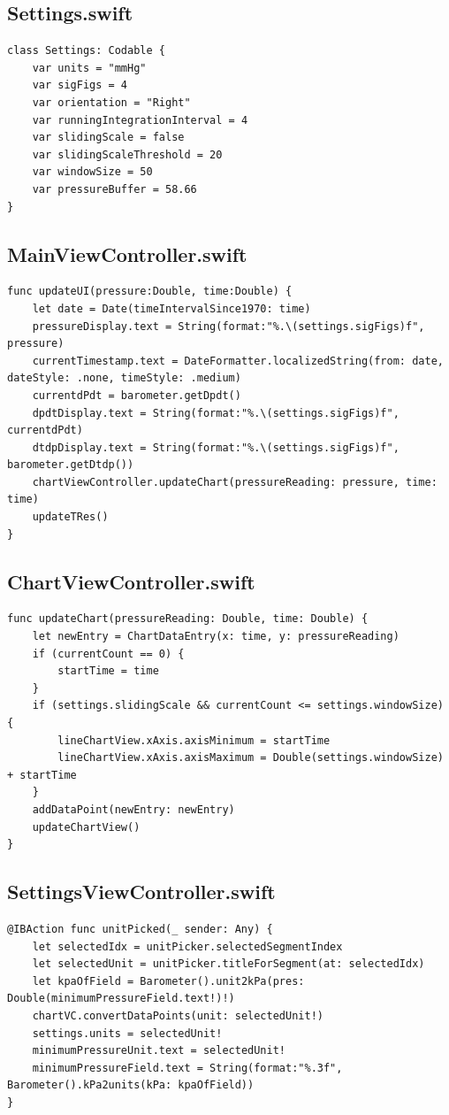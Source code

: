 \documentclass[onecolumn, draftclsnofoot,10pt, compsoc]{IEEEtran}
\begin{document}
\subsection{Settings.swift}
    \begin{lstlisting}
class Settings: Codable {
    var units = "mmHg"
    var sigFigs = 4
    var orientation = "Right"
    var runningIntegrationInterval = 4
    var slidingScale = false
    var slidingScaleThreshold = 20
    var windowSize = 50
    var pressureBuffer = 58.66
}
\end{lstlisting}

\subsection{MainViewController.swift}
    \begin{lstlisting}
func updateUI(pressure:Double, time:Double) {
    let date = Date(timeIntervalSince1970: time)
    pressureDisplay.text = String(format:"%.\(settings.sigFigs)f", pressure)
    currentTimestamp.text = DateFormatter.localizedString(from: date, dateStyle: .none, timeStyle: .medium)
    currentdPdt = barometer.getDpdt()
    dpdtDisplay.text = String(format:"%.\(settings.sigFigs)f", currentdPdt)
    dtdpDisplay.text = String(format:"%.\(settings.sigFigs)f", barometer.getDtdp())
    chartViewController.updateChart(pressureReading: pressure, time: time)
    updateTRes()
}
    \end{lstlisting}

\subsection{ChartViewController.swift}
    \begin{lstlisting}
func updateChart(pressureReading: Double, time: Double) {
    let newEntry = ChartDataEntry(x: time, y: pressureReading)
    if (currentCount == 0) {
        startTime = time
    }
    if (settings.slidingScale && currentCount <= settings.windowSize) {
        lineChartView.xAxis.axisMinimum = startTime
        lineChartView.xAxis.axisMaximum = Double(settings.windowSize) + startTime
    }
    addDataPoint(newEntry: newEntry)
    updateChartView()
}
    \end{lstlisting}

\subsection{SettingsViewController.swift}
    \begin{lstlisting}
@IBAction func unitPicked(_ sender: Any) {
    let selectedIdx = unitPicker.selectedSegmentIndex
    let selectedUnit = unitPicker.titleForSegment(at: selectedIdx)
    let kpaOfField = Barometer().unit2kPa(pres: Double(minimumPressureField.text!)!)
    chartVC.convertDataPoints(unit: selectedUnit!)
    settings.units = selectedUnit!
    minimumPressureUnit.text = selectedUnit!
    minimumPressureField.text = String(format:"%.3f", Barometer().kPa2units(kPa: kpaOfField))
}
    \end{lstlisting}

\newpage


\end{document}
